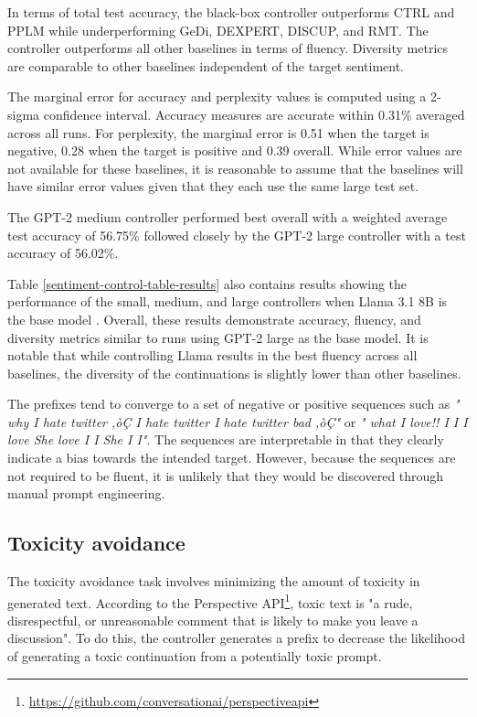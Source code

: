 \documentclass[phd,electronic,oneside,twosidetoc,letterpaper,chaptercenter,parttop,lof]{byumsphd}
\begin{document}
In terms of total test accuracy, the black-box controller outperforms CTRL and PPLM while underperforming GeDi, DEXPERT, DISCUP, and RMT. 
The controller outperforms all other baselines in terms of fluency.
Diversity metrics are comparable to other baselines independent of the target sentiment.

The marginal error for accuracy and perplexity values is computed using a 2-sigma confidence interval.
Accuracy measures are accurate within 0.31\% averaged across all runs.
For perplexity, the marginal error is 0.51 when the target is negative, 0.28 when the target is positive and 0.39 overall.
While error values are not available for these baselines, it is reasonable to assume that the baselines will have similar error values given that they each use the same large test set.

The GPT-2 medium controller performed best overall with a weighted average test accuracy of 56.75\% followed closely by the GPT-2 large controller with a test accuracy of 56.02\%.

Table \ref{sentiment-control-table-results} also contains results showing the performance of the small, medium, and large controllers when Llama 3.1 8B is the base model \cite{meta2024llama3}.
Overall, these results demonstrate accuracy, fluency, and diversity metrics similar to runs using GPT-2 large as the base model.
It is notable that while controlling Llama results in the best fluency across all baselines, the diversity of the continuations is slightly lower than other baselines.

The prefixes tend to converge to a set of negative or positive sequences such as \textit{" why I hate twitter ‚òÇ I hate twitter I hate twitter bad ‚òÇ"} or \textit{" what I love!! I I I love She love I I She I I"}.
The sequences are interpretable in that they clearly indicate a bias towards the intended target.
However, because the sequences are not required to be fluent, it is unlikely that they would be discovered through manual prompt engineering.

\subsection{Toxicity avoidance}

The toxicity avoidance task involves minimizing the amount of toxicity in generated text. According to the Perspective API\footnote{\href{https://github.com/conversationai/perspectiveapi}{https://github.com/conversationai/perspectiveapi}}, toxic text is "a rude, disrespectful, or unreasonable comment that is likely to make you leave a discussion".
To do this, the controller generates a prefix to decrease the likelihood of generating a toxic continuation from a potentially toxic prompt.
\end{document}
